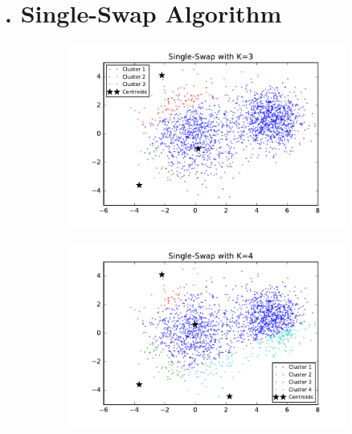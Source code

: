 \section*{\Large {}. Single-Swap Algorithm}

\begin{figure}[htb]
        \centering
        \begin{subfigure}[b]{0.475\textwidth}
            \centering
            \includegraphics[width=\textwidth]{./figures/clustering_singleSwap_3.pdf}
        \end{subfigure}
        \hfill
        \begin{subfigure}[b]{0.475\textwidth}  
            \centering 
            \includegraphics[width=\textwidth]{./figures/clustering_singleSwap_4.pdf}

\end{subfigure}
\end{figure}
